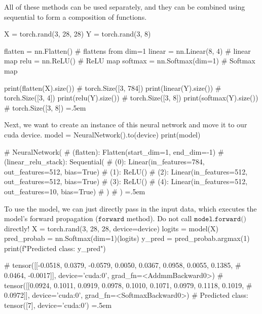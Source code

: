 \documentclass{article}
\newenvironment{cverbatim}
    {\SaveVerbatim{cverb}}
    {\endSaveVerbatim
      \flushleft\fboxrule=0pt\fboxsep=.5em
      \colorbox{cverbbg}{%
        \makebox[\dimexpr\linewidth-2\fboxsep][l]{\BUseVerbatim{cverb}}%
      }
      \endflushleft
  }
\theoremstyle{definition}
\theoremstyle{remark}
\theoremstyle{definition}
\begin{document}
      All of these methods can be used separately, and they can be combined using sequential to form a composition of functions. 

      \begin{cverbatim}
        X = torch.rand(3, 28, 28)
        Y = torch.rand(3, 8)

        flatten = nn.Flatten()      # flattens from dim=1 
        linear = nn.Linear(8, 4)    # linear map 
        relu = nn.ReLU()            # ReLU map 
        softmax = nn.Softmax(dim=1) # Softmax map 

        print(flatten(X).size())    # torch.Size([3, 784])
        print(linear(Y).size())     # torch.Size([3, 4])
        print(relu(Y).size())       # torch.Size([3, 8])
        print(softmax(Y).size())    # torch.Size([3, 8])
      \end{cverbatim}

      Next, we want to create an instance of this neural network and move it to our cuda device. 
      \begin{cverbatim}
        model = NeuralNetwork().to(device)
        print(model)

        # NeuralNetwork(
        #   (flatten): Flatten(start_dim=1, end_dim=-1)
        #   (linear_relu_stack): Sequential(
        #     (0): Linear(in_features=784, out_features=512, bias=True)
        #     (1): ReLU()
        #     (2): Linear(in_features=512, out_features=512, bias=True)
        #     (3): ReLU()
        #     (4): Linear(in_features=512, out_features=10, bias=True)
        #   )
        # )
      \end{cverbatim}

      To use the model, we can just directly pass in the input data, which executes the model's forward propagation ($\texttt{forward}$ method). Do not call $\texttt{model.forward()}$ directly! 
      \begin{cverbatim}
        X = torch.rand(3, 28, 28, device=device)
        logits = model(X)
        pred_probab = nn.Softmax(dim=1)(logits)
        y_pred = pred_probab.argmax(1)
        print(f"Predicted class: {y_pred}")

        # tensor([[-0.0518,  0.0379, -0.0579,  0.0050,  0.0367,  0.0958,  0.0055,  0.1385,
        #           0.0464, -0.0017]], device='cuda:0', grad_fn=<AddmmBackward0>)
        # tensor([[0.0924, 0.1011, 0.0919, 0.0978, 0.1010, 0.1071, 0.0979, 0.1118, 0.1019,
        #          0.0972]], device='cuda:0', grad_fn=<SoftmaxBackward0>)
        # Predicted class: tensor([7], device='cuda:0')
      \end{cverbatim}
\end{document}
